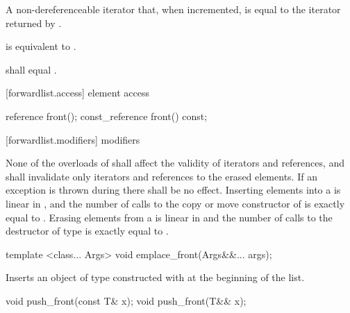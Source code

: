 \begin{itemdescr}
\pnum
\returns A non-dereferenceable iterator that, when incremented, is equal to the iterator
returned by .

\pnum
\effects {} is equivalent to
.

\pnum
\remarks {} shall equal .
\end{itemdescr}

[forwardlist.access]{ element access}

%
%
\begin{itemdecl}
reference front();
const_reference front() const;
\end{itemdecl}

\begin{itemdescr}
\pnum
\returns {}
\end{itemdescr}

[forwardlist.modifiers]{ modifiers}

\pnum
None of the overloads of  shall affect the validity of iterators and
references, and  shall invalidate only iterators and references to
the erased elements. If an exception is thrown during  there shall
be no effect. Inserting  elements into a  is linear in
, and the number of calls to the copy or move constructor of  is
exactly equal to . Erasing  elements from a  is
linear in  and the number of calls to the destructor of type  is
exactly equal to .

%
%
\begin{itemdecl}
template <class... Args> void emplace_front(Args&&... args);
\end{itemdecl}

\begin{itemdescr}
\pnum
\effects Inserts an object of type  constructed with
 at the beginning of the list.
\end{itemdescr}

%
%
\begin{itemdecl}
void push_front(const T& x);
void push_front(T&& x);
\end{itemdecl}

